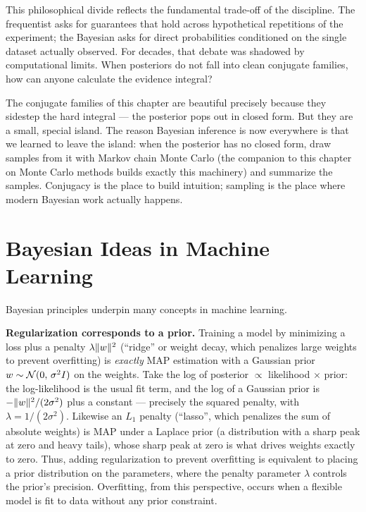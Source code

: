 This philosophical divide reflects the fundamental trade-off of the discipline. The frequentist asks for guarantees that hold across hypothetical repetitions of the experiment; the Bayesian asks for direct probabilities conditioned on the single dataset actually observed. For decades, that debate was shadowed by computational limits. When posteriors do not fall into clean conjugate families, how can anyone calculate the evidence integral?

\begin{aestheticbox}
The conjugate families of this chapter are beautiful precisely because they sidestep the
hard integral --- the posterior pops out in closed form. But they are a small, special
island. The reason Bayesian inference is now everywhere is that we learned to leave the
island: when the posterior has no closed form, draw samples from it with Markov chain Monte
Carlo (the companion to this chapter on Monte Carlo methods builds exactly this machinery)
and summarize the samples. Conjugacy is the place to build intuition; sampling is the place
where modern Bayesian work actually happens.
\end{aestheticbox}

\section{Bayesian Ideas in Machine Learning}
\label{ch31:ml}

Bayesian principles underpin many concepts in machine learning.

\begin{applicationbox}
\textbf{Regularization corresponds to a prior.} Training a model by minimizing a loss plus
a penalty $\lambda\lVert w\rVert^2$ (``ridge'' or weight decay, which penalizes large weights to prevent overfitting) is \emph{exactly} MAP estimation
with a Gaussian prior $w\sim\mathcal{N}(0,\,\sigma^2 I)$ on the weights. Take the log of
posterior $\propto$ likelihood $\times$ prior: the log-likelihood is the usual fit term,
and the log of a Gaussian prior is $-\lVert w\rVert^2/(2\sigma^2)$ plus a constant --- precisely
the squared penalty, with $\lambda = 1/(2\sigma^2)$. Likewise an $L_1$ penalty (``lasso'', which penalizes the sum of absolute weights)
is MAP under a Laplace prior (a distribution with a sharp peak at zero and heavy tails), whose sharp peak at zero is what drives weights exactly to
zero. Thus, adding regularization to prevent overfitting is equivalent to placing a
prior distribution on the parameters, where the penalty parameter $\lambda$ controls
the prior's precision. Overfitting, from this perspective, occurs when a flexible
model is fit to data without any prior constraint.
\end{applicationbox}

